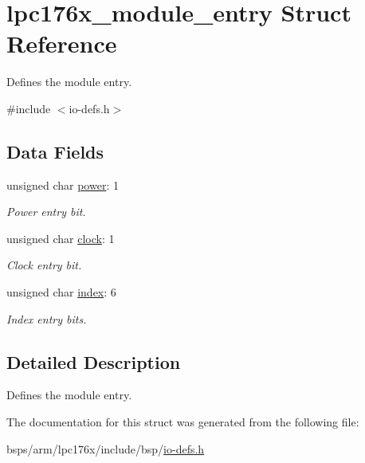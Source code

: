 \hypertarget{structlpc176x__module__entry}{}\section{lpc176x\+\_\+module\+\_\+entry Struct Reference}
\label{structlpc176x__module__entry}


Defines the module entry.  




{\ttfamily \#include $<$io-\/defs.\+h$>$}

\subsection*{Data Fields}
\begin{DoxyCompactItemize}
\item 
\mbox{\label{structlpc176x__module__entry_aea898f0f3e60258c619e859510e2a97e}} 
unsigned char \mbox{\hyperlink{structlpc176x__module__entry_aea898f0f3e60258c619e859510e2a97e}{power}}\+: 1
\begin{DoxyCompactList}\small\item\em Power entry bit. \end{DoxyCompactList}\item 
\mbox{\label{structlpc176x__module__entry_a63302361a30f3391a060e5848f8eca92}} 
unsigned char \mbox{\hyperlink{structlpc176x__module__entry_a63302361a30f3391a060e5848f8eca92}{clock}}\+: 1
\begin{DoxyCompactList}\small\item\em Clock entry bit. \end{DoxyCompactList}\item 
\mbox{\label{structlpc176x__module__entry_a529f11b59b9638b8ee961cdf3a6b6aaf}} 
unsigned char \mbox{\hyperlink{structlpc176x__module__entry_a529f11b59b9638b8ee961cdf3a6b6aaf}{index}}\+: 6
\begin{DoxyCompactList}\small\item\em Index entry bits. \end{DoxyCompactList}\end{DoxyCompactItemize}


\subsection{Detailed Description}
Defines the module entry. 

The documentation for this struct was generated from the following file\+:\begin{DoxyCompactItemize}
\item 
bsps/arm/lpc176x/include/bsp/\mbox{\hyperlink{io-defs_8h}{io-\/defs.\+h}}\end{DoxyCompactItemize}
